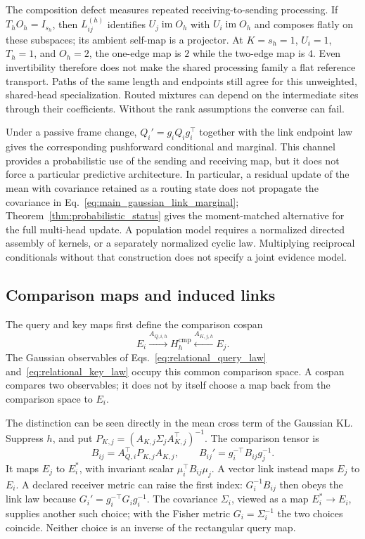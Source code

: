 \documentclass[twoside,11pt]{article}
\begin{document}
The composition defect measures repeated receiving-to-sending processing. If $T_hO_h=I_{s_h}$, then $L_{ij}^{(h)}$ identifies $U_j\operatorname{im}O_h$ with $U_i\operatorname{im}O_h$ and composes flatly on these subspaces; its ambient self-map is a projector. At $K=s_h=1$, $U_i=1$, $T_h=1$, and $O_h=2$, the one-edge map is $2$ while the two-edge map is $4$. Even invertibility therefore does not make the shared processing family a flat reference transport. Paths of the same length and endpoints still agree for this unweighted, shared-head specialization. Routed mixtures can depend on the intermediate sites through their coefficients. Without the rank assumptions the converse can fail.

Under a passive frame change, $Q_i'=g_iQ_ig_i^\top$ together with the link endpoint law gives the corresponding pushforward conditional and marginal. This channel provides a probabilistic use of the sending and receiving map, but it does not force a particular predictive architecture. In particular, a residual update of the mean with covariance retained as a routing state does not propagate the covariance in Eq.~\eqref{eq:main_gaussian_link_marginal}; Theorem~\ref{thm:probabilistic_status} gives the moment-matched alternative for the full multi-head update. A population model requires a normalized directed assembly of kernels, or a separately normalized cyclic law. Multiplying reciprocal conditionals without that construction does not specify a joint evidence model.

\subsection{Comparison maps and induced links}
\label{sec:comparison_lift}

The query and key maps first define the comparison cospan
\begin{equation}
E_i\xrightarrow{A_{Q,i,h}}H_h^{\mathrm{cmp}}
\xleftarrow{A_{K,j,h}}E_j.
\label{eq:comparison_cospan}
\end{equation}
The Gaussian observables of Eqs.~\eqref{eq:relational_query_law} and~\eqref{eq:relational_key_law} occupy this common comparison space. A cospan compares two observables; it does not by itself choose a map back from the comparison space to $E_i$.

The distinction can be seen directly in the mean cross term of the Gaussian KL. Suppress $h$, and put $P_{K,j}=(A_{K,j}\Sigma_jA_{K,j}^\top)^{-1}$. The comparison tensor is
\begin{equation}
B_{ij}=A_{Q,i}^\top P_{K,j}A_{K,j},\qquad
B_{ij}'=g_i^{-\top}B_{ij}g_j^{-1}.
\label{eq:comparison_bilinear_tensor}
\end{equation}
It maps $E_j$ to $E_i^*$, with invariant scalar $\mu_i^\top B_{ij}\mu_j$. A vector link instead maps $E_j$ to $E_i$. A declared receiver metric can raise the first index: $G_i^{-1}B_{ij}$ then obeys the link law because $G_i'=g_i^{-\top}G_ig_i^{-1}$. The covariance $\Sigma_i$, viewed as a map $E_i^*\to E_i$, supplies another such choice; with the Fisher metric $G_i=\Sigma_i^{-1}$ the two choices coincide. Neither choice is an inverse of the rectangular query map.
\end{document}
